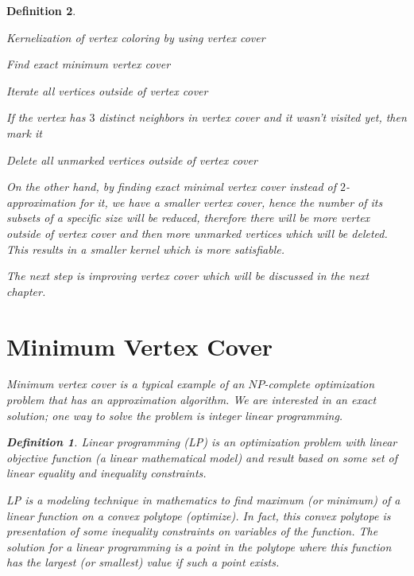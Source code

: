 \documentclass[12pt]{article}
\theoremstyle{slplain}
\newtheorem{defi}{Definition}
\begin{document}
\begin{defi}
\vspace{1cm}

\begin{algorithm}[H]
\SetAlgoLined
\DontPrintSemicolon
  \caption{Kernelization of vertex coloring by using vertex cover}{\label{kern}}

Find exact minimum vertex cover\;

Iterate all vertices outside of vertex cover\;

If the vertex has $3$ distinct neighbors in vertex cover and it wasn't
visited yet, then mark it\;

Delete all unmarked vertices outside of vertex cover\;
\end{algorithm}

\vspace{1cm}

On the other hand, by finding exact minimal vertex cover instead of $2$-approximation for it, we have a smaller vertex cover, hence the number of its subsets of a specific size will be reduced, therefore there will be more vertex outside of vertex cover and then more unmarked vertices which will be deleted. This results in a smaller kernel which is more satisfiable.


The next step is improving vertex cover which will be discussed in the next chapter.






\newpage
\section{Minimum Vertex Cover}{\label{vertex_cover}}
Minimum vertex cover is a typical example of an $NP$-complete optimization problem that has an approximation algorithm. We are interested in an exact solution; one way to solve the problem is integer linear programming.

\begin{defi}
Linear programming (LP) is an optimization problem with linear objective function (a linear mathematical model) and result based on some set of linear equality and inequality constraints. 

LP is a modeling technique in mathematics to find maximum (or minimum) of a linear function on a convex polytope (optimize). In fact, this convex polytope is presentation of some inequality constraints on variables of the function. The solution for a linear programming is a point in the polytope where this function has the largest (or smallest) value if such a point exists.


\end{defi}
\end{defi}
\end{document}
